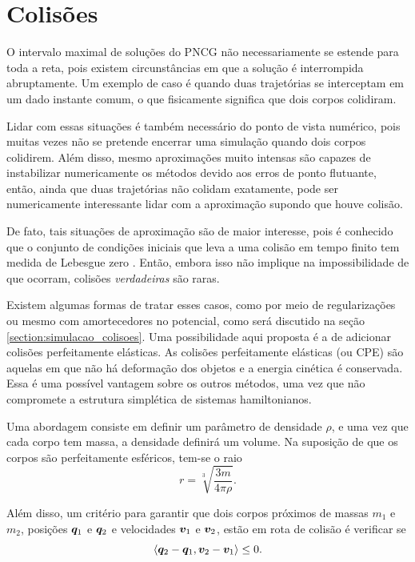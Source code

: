 \section{Colisões}\label{section:pncg_colisoes}

O intervalo maximal de soluções do PNCG não necessariamente se estende para toda a reta, pois existem circunstâncias em que a solução é interrompida abruptamente. Um exemplo de caso é quando duas trajetórias se interceptam em um dado instante comum, o que fisicamente significa que dois corpos colidiram. 

Lidar com essas situações é também necessário do ponto de vista numérico, pois muitas vezes não se pretende encerrar uma simulação quando dois corpos colidirem. Além disso, mesmo aproximações muito intensas são capazes de instabilizar numericamente os métodos devido aos erros de ponto flutuante, então, ainda que duas trajetórias não colidam exatamente, pode ser numericamente interessante lidar com a aproximação supondo que houve colisão.

De fato, tais situações de aproximação são de maior interesse, pois é conhecido que o conjunto de condições iniciais que leva a uma colisão em tempo finito tem medida de Lebesgue zero \citep{Saari1971}. Então, embora isso não implique na impossibilidade de que ocorram, colisões \textit{verdadeiras} são raras.

Existem algumas formas de tratar esses casos, como por meio de regularizações ou mesmo com amortecedores no potencial, como será discutido na seção \ref{section:simulacao_colisoes}. Uma possibilidade aqui proposta é a de adicionar colisões perfeitamente elásticas. As colisões perfeitamente elásticas (ou CPE) são aquelas em que não há deformação dos objetos e a energia cinética é conservada. Essa é uma possível vantagem sobre os outros métodos, uma vez que não compromete a estrutura simplética de sistemas hamiltonianos.

Uma abordagem consiste em definir um parâmetro de densidade $\rho$, e uma vez que cada corpo tem massa, a densidade definirá um volume. Na suposição de que os corpos são perfeitamente esféricos, tem-se o raio
\begin{equation}
    r = \sqrt[3]{\dfrac{3 m}{4 \pi \rho}}.
\end{equation}

Além disso, um critério para garantir que dois corpos próximos de massas $m_1$ e $m_2$, posições $\bm q_1$ e $\bm q_2$ e velocidades $\bm v_1$ e $\bm v_2$, estão em rota de colisão é verificar se
\begin{equation*}
    \left\langle \bm q_2 - \bm q_1, \bm v_2 - \bm v_1 \right\rangle \leq 0.
\end{equation*}


